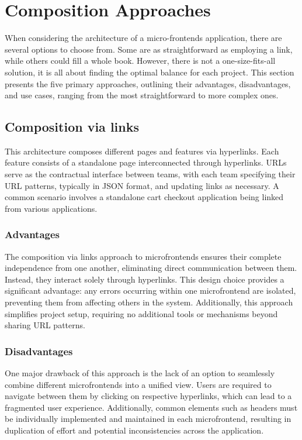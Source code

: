 \section{Composition Approaches}
When considering the architecture of a micro-frontends application, there are several options to choose from. Some are as straightforward as employing a link, while others could fill a whole book. However, there is not a one-size-fits-all solution, it is all about finding the optimal balance for each project. This section presents the five primary approaches, outlining their advantages, disadvantages, and use cases, ranging from the most straightforward to more complex ones.

\subsection{Composition via links}
This architecture composes different pages and features via hyperlinks. Each feature consists of a standalone page interconnected through hyperlinks. URLs serve as the contractual interface between teams, with each team specifying their URL patterns, typically in JSON format, and updating links as necessary. A common scenario involves a standalone cart checkout application being linked from various applications. \cite{MFInAction}\cite{MFPatterns}

\subsubsection{Advantages}
The composition via links approach to microfrontends ensures their complete independence from one another, eliminating direct communication between them. Instead, they interact solely through hyperlinks. This design choice provides a significant advantage: any errors occurring within one microfrontend are isolated, preventing them from affecting others in the system. Additionally, this approach simplifies project setup, requiring no additional tools or mechanisms beyond sharing URL patterns. \cite{MFInAction}\cite{MFPatterns}

\subsubsection{Disadvantages}
One major drawback of this approach is the lack of an option to seamlessly combine different microfrontends into a unified view. Users are required to navigate between them by clicking on respective hyperlinks, which can lead to a fragmented user experience. Additionally, common elements such as headers must be individually implemented and maintained in each microfrontend, resulting in duplication of effort and potential inconsistencies across the application. \cite{MFInAction}\cite{MFPatterns}

